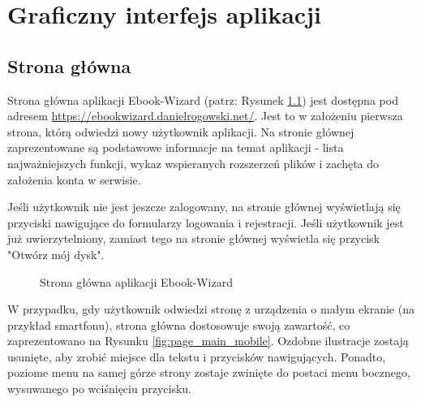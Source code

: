 \chapter{Graficzny interfejs aplikacji}
\label{chapter:chapter_gui}

\section{Strona główna}

Strona główna aplikacji Ebook-Wizard (patrz: Rysunek \ref{fig:page_main}) jest dostępna pod adresem \href{https://ebookwizard.danielrogowski.net/}{https://ebookwizard.danielrogowski.net/}. Jest to w założeniu pierwsza strona, którą odwiedzi nowy użytkownik aplikacji. Na stronie głównej zaprezentowane są podstawowe informacje na temat aplikacji - lista najważniejszych funkcji, wykaz wspieranych rozszerzeń plików i zachęta do założenia konta w serwisie.

Jeśli użytkownik nie jest jeszcze zalogowany, na stronie głównej wyświetlają się przyciski nawigujące do formularzy logowania i rejestracji. Jeśli użytkownik jest już uwierzytelniony, zamiast tego na stronie głównej wyświetla się przycisk "Otwórz mój dysk".


\begin{figure}[h]
    \centering
    \setlength{\fboxsep}{0pt}
    \setlength{\fboxrule}{0.4pt}
    \caption{Strona główna aplikacji Ebook-Wizard}
    \label{fig:page_main}
\end{figure}

W przypadku, gdy użytkownik odwiedzi stronę z urządzenia o małym ekranie (na przykład smartfonu), strona główna dostosowuje swoją zawartość, co zaprezentowano na Rysunku \ref{fig:page_main_mobile}. Ozdobne ilustracje zostają usunięte, aby zrobić miejsce dla tekstu i przycisków nawigujących. Ponadto, poziome menu na samej górze strony zostaje zwinięte do postaci menu bocznego, wysuwanego po wciśnięciu przycisku.

